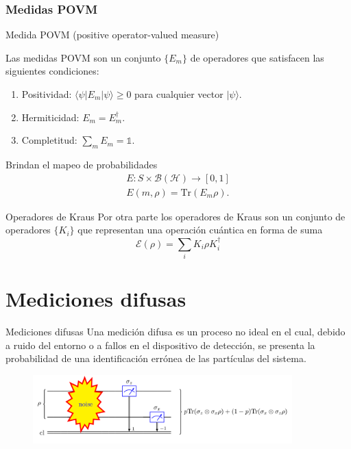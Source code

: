 \documentclass[svgnames,12pt,aspectratio=149]{beamer}
\newcommand{\E}{\mathcal{E}}
\begin{document}
\begin{frame}
\frametitle{Medidas POVM}
    \begin{block}{Medida POVM (positive operator-valued measure) }
      
Las medidas POVM son  un conjunto $\{E_{m}\}$ de operadores que satisfacen las siguientes condiciones:
\begin{enumerate}
    \item Positividad: $\langle \psi |E_m|\psi \rangle \ge 0 $ para cualquier vector $|\psi\rangle$.
    \item Hermiticidad: $E_m=E_{m}^\dagger$.
    \item  Completitud: $\sum_m E_m =\mathds{1}$.
\end{enumerate}
    \end{block}
  Brindan el mapeo de probabilidades \begin{equation*}\begin{split}
      E:S\times \mathcal{B(H)}\longrightarrow [0,1]\\
      E(m,\rho)=\text{Tr}(E_m\rho).
  \end{split}\end{equation*}


\end{frame}

\begin{frame}{Operadores de Kraus}
  Por otra parte los operadores de Kraus son un conjunto de operadores $\{K_i\} $ que representan una operación cuántica en forma de suma \begin{equation*}
    \E(\rho)=\sum_i K_i\rho K_i^\dagger \end{equation*}
\end{frame}







\section{Mediciones difusas}

\begin{frame}{Mediciones difusas}
Una medición difusa es un proceso no ideal en el cual, debido a ruido
del entorno o a fallos en el dispositivo de detección, se presenta la probabilidad de una
identificación errónea de las partículas del sistema.
\vspace{1cm}
\begin{figure}[H]
  \centering
 \includegraphics[width=100mm]{images/fm1.png}
  \caption*{}
\end{figure} 
\end{frame}
\end{document}
